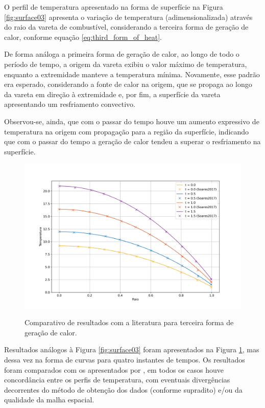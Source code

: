O perfil de temperatura apresentado na forma de superfície na Figura \ref{fig:surface03} apresenta o variação de temperatura (adimensionalizada) através do raio da vareta de combustível, considerando a terceira forma de geração de calor, conforme equação \ref{eq:third_form_of_heat}.

De forma análoga a primeira forma de geração de calor, ao longo de todo o período de tempo, a origem da vareta exibiu o valor máximo de temperatura, enquanto a extremidade manteve a temperatura mínima. Novamente, esse padrão era esperado, considerando a fonte de calor na origem, que se propaga ao longo da vareta em direção à extremidade e, por fim, a superfície da vareta apresentando um resfriamento convectivo.

Observou-se, ainda, que com o passar do tempo houve um aumento expressivo de temperatura na origem com propagação para a região da superfície, indicando que com o passar do tempo a geração de calor tendeu a superar o resfriamento na superfície.

\begin{figure}[H]
    \centering
    \caption{Comparativo de resultados com a literatura para terceira forma de geração de calor.}
    \includegraphics[scale=0.5]{figures/results/Fig09.png}
    \label{fig:profile03}
\end{figure}

Resultados análogos à Figura \ref{fig:surface03} foram apresentados na Figura \ref{fig:profile03}, mas dessa vez na forma de curvas para quatro instantes de tempos. Os resultados foram comparados com os apresentados por \citet{soares2017}, em todos os casos houve concordância entre os perfis de temperatura, com eventuais divergências decorrentes do método de obtenção dos dados (conforme supradito) e/ou da qualidade da malha espacial.

